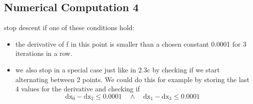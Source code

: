 \documentclass[12pt]{article}
\begin{document}
\subsection{Numerical Computation 4}
stop descent if one of these conditions hold:
\begin{itemize}
    \item 
        the derivative of f in this point is smaller than a chosen constant 0.0001 for 3 iterations in a row.
    \item
        we also stop in a special case just like in 2.3c by checking if we start alternating between 2 points. We could do this for example by storing the last 4 values for the derivative and checking if 
        $$ \text{dx}_0 - \text{dx}_2 \leq 0.0001 \quad \land \quad \text{dx}_1 - \text{dx}_3 \leq 0.0001 $$
\end{itemize}
\end{document}
